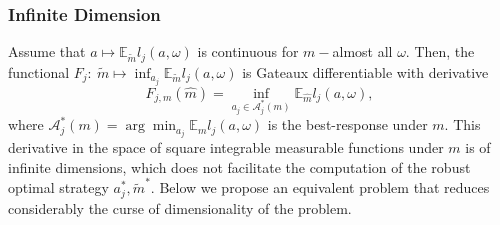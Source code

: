 \documentclass{article}
\begin{document}
\subsubsection{Infinite Dimension}
Assume that $a\mapsto \mathbb{E}_{\tilde{m}} l_j(a,\omega)$ is continuous for $m-$almost all $\omega$. Then, the functional $F_j:\ \tilde{m}\mapsto \inf_{a_j}\mathbb{E}_{\tilde{m}} l_j(a,\omega)$ is Gateaux differentiable with derivative
$$F_{j,m} (\hat{m})=\inf_{a_j\in \mathcal{A}_j^*(m)}\mathbb{E}_{\hat{m}} l_j(a,\omega),
$$
where $ \mathcal{A}_j^*(m)=\arg\min_{a_j} \mathbb{E}_{m} l_j(a,\omega)$ is the best-response under $m$. This derivative in the space of square integrable measurable functions under $m$ is of infinite dimensions, which does not facilitate the computation of the robust optimal strategy $a_j^*, \tilde{m}^*$.
Below we propose an equivalent problem that reduces considerably the curse of dimensionality of the problem.
\end{document}
